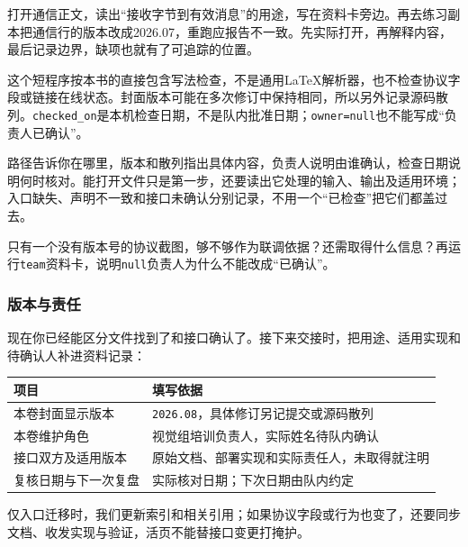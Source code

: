 \begin{example}
打开通信正文，读出“接收字节到有效消息”的用途，写在资料卡旁边。再去练习副本把通信行的版本改成2026.07，重跑应报告不一致。先实际打开，再解释内容，最后记录边界，缺项也就有了可追踪的位置。
\end{example}

\begin{note}
这个短程序按本书的直接包含写法检查，不是通用LaTeX解析器，也不检查协议字段或链接在线状态。封面版本可能在多次修订中保持相同，所以另外记录源码散列。\texttt{checked\_on}是本机检查日期，不是队内批准日期；\texttt{owner=null}也不能写成“负责人已确认”。
\end{note}

\begin{conclusion}
路径告诉你在哪里，版本和散列指出具体内容，负责人说明由谁确认，检查日期说明何时核对。能打开文件只是第一步，还要读出它处理的输入、输出及适用环境；入口缺失、声明不一致和接口未确认分别记录，不用一个“已检查”把它们都盖过去。
\end{conclusion}

\begin{exercise}
\label{v3-ex-index-3}
只有一个没有版本号的协议截图，够不够作为联调依据？还需取得什么信息？再运行\texttt{team}资料卡，说明\texttt{null}负责人为什么不能改成“已确认”。
\end{exercise}

\subsubsection{版本与责任}

现在你已经能区分文件找到了和接口确认了。接下来交接时，把用途、适用实现和待确认人补进资料记录：
\begin{center}
\begin{tabular}{@{}p{}p{}@{}}
\toprule[1.5pt]
项目 & 填写依据 \\
\midrule[1pt]
本卷封面显示版本 & \texttt{2026.08}，具体修订另记提交或源码散列 \\
本卷维护角色 & 视觉组培训负责人，实际姓名待队内确认 \\
接口双方及适用版本 & 原始文档、部署实现和实际责任人，未取得就注明 \\
复核日期与下一次复盘 & 实际核对日期；下次日期由队内约定 \\
\bottomrule[1.5pt]
\end{tabular}
\end{center}

仅入口迁移时，我们更新索引和相关引用；如果协议字段或行为也变了，还要同步文档、收发实现与验证，活页不能替接口变更打掩护。

